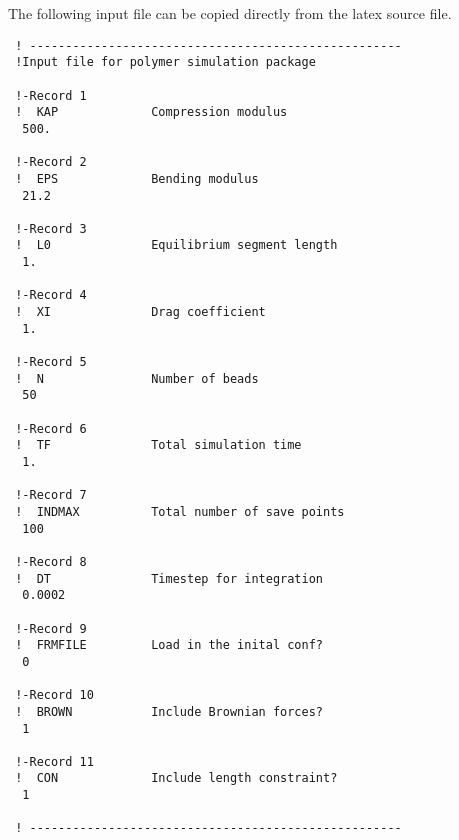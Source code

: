 \documentclass[11pt]{article}
\begin{document}
The following input file can be copied directly from the latex source file.
\begin{verbatim}
 ! ----------------------------------------------------
 !Input file for polymer simulation package

 !-Record 1
 !  KAP             Compression modulus
  500.

 !-Record 2
 !  EPS             Bending modulus
  21.2

 !-Record 3
 !  L0              Equilibrium segment length
  1.

 !-Record 4
 !  XI              Drag coefficient
  1.

 !-Record 5
 !  N               Number of beads
  50

 !-Record 6
 !  TF              Total simulation time
  1.

 !-Record 7
 !  INDMAX          Total number of save points
  100

 !-Record 8
 !  DT              Timestep for integration
  0.0002

 !-Record 9
 !  FRMFILE         Load in the inital conf?
  0

 !-Record 10
 !  BROWN           Include Brownian forces?
  1

 !-Record 11
 !  CON             Include length constraint?
  1

 ! ----------------------------------------------------
\end{verbatim}
\end{document}
